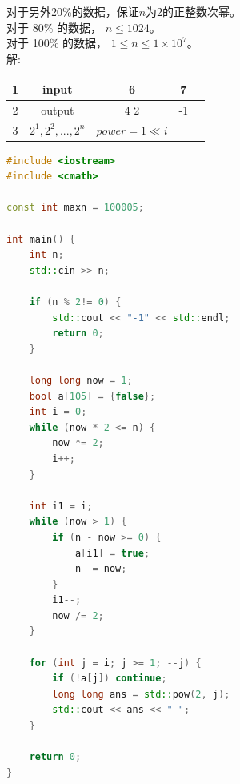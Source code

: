 \documentclass[12pt,twiside,a4paper]{ctexbook}
\numberwithin{chapter}{part}
\begin{document}
对于另外20\%的数据，保证$n$为2的正整数次幂。\\
对于 80\% 的数据， $n\leq 1024$。\\
对于 100\% 的数据， $1\leq n\leq 1\times10^7$。\\
解:\\
\begin{tabular}{|c|c|c|c|c|}
\hline
1 & input &6 & 7\\
\hline
2 & output & 4 2 & -1\\
\hline
3 & $2^1,2^2,...,2^n$ & $power = 1\ll i$& \\
\hline
\end{tabular}
\begin{lstlisting}[language=C++,breaklines=true]
#include <iostream>
#include <cmath>

const int maxn = 100005;

int main() {
    int n;
    std::cin >> n;

    if (n % 2!= 0) {
        std::cout << "-1" << std::endl;
        return 0;
    }

    long long now = 1;
    bool a[105] = {false};
    int i = 0;
    while (now * 2 <= n) {
        now *= 2;
        i++;
    }

    int i1 = i;
    while (now > 1) {
        if (n - now >= 0) {
            a[i1] = true;
            n -= now;
        }
        i1--;
        now /= 2;
    }

    for (int j = i; j >= 1; --j) {
        if (!a[j]) continue;
        long long ans = std::pow(2, j);
        std::cout << ans << " ";
    }

    return 0;
}
\end{lstlisting}
\end{document}
